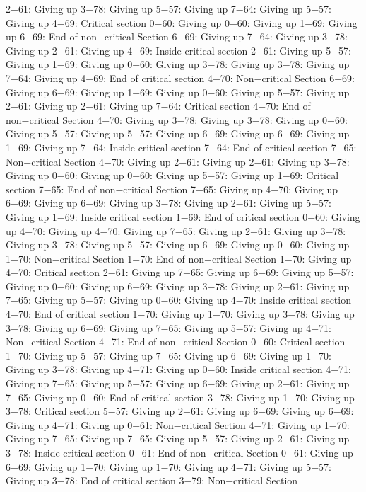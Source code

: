 2−61: Giving up
3−78: Giving up
5−57: Giving up
7−64: Giving up
5−57: Giving up
4−69: Critical section
0−60: Giving up
0−60: Giving up
1−69: Giving up
6−69: End of non−critical Section
6−69: Giving up
7−64: Giving up
3−78: Giving up
2−61: Giving up
4−69: Inside critical section
2−61: Giving up
5−57: Giving up
1−69: Giving up
0−60: Giving up
3−78: Giving up
3−78: Giving up
7−64: Giving up
4−69: End of critical section
4−70: Non−critical Section
6−69: Giving up
6−69: Giving up
1−69: Giving up
0−60: Giving up
5−57: Giving up
2−61: Giving up
2−61: Giving up
7−64: Critical section
4−70: End of non−critical Section
4−70: Giving up
3−78: Giving up
3−78: Giving up
0−60: Giving up
5−57: Giving up
5−57: Giving up
6−69: Giving up
6−69: Giving up
1−69: Giving up
7−64: Inside critical section
7−64: End of critical section
7−65: Non−critical Section
4−70: Giving up
2−61: Giving up
2−61: Giving up
3−78: Giving up
0−60: Giving up
0−60: Giving up
5−57: Giving up
1−69: Critical section
7−65: End of non−critical Section
7−65: Giving up
4−70: Giving up
6−69: Giving up
6−69: Giving up
3−78: Giving up
2−61: Giving up
5−57: Giving up
1−69: Inside critical section
1−69: End of critical section
0−60: Giving up
4−70: Giving up
4−70: Giving up
7−65: Giving up
2−61: Giving up
3−78: Giving up
3−78: Giving up
5−57: Giving up
6−69: Giving up
0−60: Giving up
1−70: Non−critical Section
1−70: End of non−critical Section
1−70: Giving up
4−70: Critical section
2−61: Giving up
7−65: Giving up
6−69: Giving up
5−57: Giving up
0−60: Giving up
6−69: Giving up
3−78: Giving up
2−61: Giving up
7−65: Giving up
5−57: Giving up
0−60: Giving up
4−70: Inside critical section
4−70: End of critical section
1−70: Giving up
1−70: Giving up
3−78: Giving up
3−78: Giving up
6−69: Giving up
7−65: Giving up
5−57: Giving up
4−71: Non−critical Section
4−71: End of non−critical Section
0−60: Critical section
1−70: Giving up
5−57: Giving up
7−65: Giving up
6−69: Giving up
1−70: Giving up
3−78: Giving up
4−71: Giving up
0−60: Inside critical section
4−71: Giving up
7−65: Giving up
5−57: Giving up
6−69: Giving up
2−61: Giving up
7−65: Giving up
0−60: End of critical section
3−78: Giving up
1−70: Giving up
3−78: Critical section
5−57: Giving up
2−61: Giving up
6−69: Giving up
6−69: Giving up
4−71: Giving up
0−61: Non−critical Section
4−71: Giving up
1−70: Giving up
7−65: Giving up
7−65: Giving up
5−57: Giving up
2−61: Giving up
3−78: Inside critical section
0−61: End of non−critical Section
0−61: Giving up
6−69: Giving up
1−70: Giving up
1−70: Giving up
4−71: Giving up
5−57: Giving up
3−78: End of critical section
3−79: Non−critical Section
